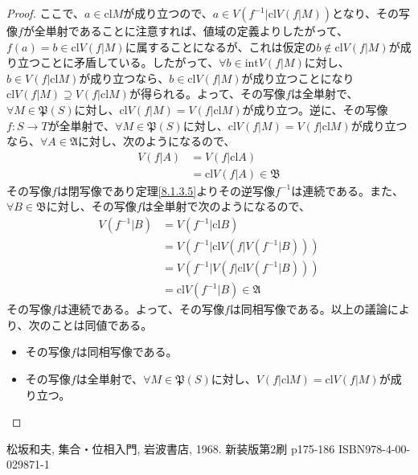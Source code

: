 \documentclass[dvipdfmx]{jsarticle}
\begin{document}
\begin{proof}
ここで、$a \in {\mathrm{cl}}M$が成り立つので、$a \in V\left( f^{- 1}|{\mathrm{cl}}{V\left( f|M \right)} \right)$となり、その写像$f$が全単射であることに注意すれば、値域の定義よりしたがって、$f(a) = b \in {\mathrm{cl}}{V\left( f|M \right)}$に属することになるが、これは仮定の$b \notin {\mathrm{cl}}{V\left( f|M \right)}$が成り立つことに矛盾している。したがって、$\forall b \in {\mathrm{int}}{V\left( f|M \right)}$に対し、$b \in V\left( f|{\mathrm{cl}}M \right)$が成り立つなら、$b \in {\mathrm{cl}}{V\left( f|M \right)}$が成り立つことになり${\mathrm{cl}}{V\left( f|M \right)} \supseteq V\left( f|{\mathrm{cl}}M \right)$が得られる。よって、その写像$f$は全単射で、$\forall M\in \mathfrak{P}(S)$に対し、${\mathrm{cl}}{V\left( f|M \right)} = V\left( f|{\mathrm{cl}}M \right)$が成り立つ。逆に、その写像$f:S \rightarrow T$が全単射で、$\forall M\in \mathfrak{P}(S)$に対し、${\mathrm{cl}}{V\left( f|M \right)} = V\left( f|{\mathrm{cl}}M \right)$が成り立つなら、$\forall A \in \mathfrak{A}$に対し、次のようになるので、
\begin{align*}
V\left( f|A \right) &= V\left( f|{\mathrm{cl}}A \right)\\
&= {\mathrm{cl}}{V\left( f|A \right)} \in \mathfrak{B}
\end{align*}
その写像$f$は閉写像であり定理\ref{8.1.3.5}よりその逆写像$f^{- 1}$は連続である。また、$\forall B \in \mathfrak{B}$に対し、その写像$f$は全単射で次のようになるので、
\begin{align*}
V\left( f^{- 1}|B \right) &= V\left( f^{- 1}|{\mathrm{cl}}B \right)\\
&= V\left( f^{- 1}|{\mathrm{cl}}{V\left( f|V\left( f^{- 1}|B \right) \right)} \right)\\
&= V\left( f^{- 1}|V\left( f|{\mathrm{cl}}{V\left( f^{- 1}|B \right)} \right) \right)\\
&= {\mathrm{cl}}{V\left( f^{- 1}|B \right)} \in \mathfrak{A}
\end{align*}
その写像$f$は連続である。よって、その写像$f$は同相写像である。以上の議論により、次のことは同値である。
\begin{itemize}
\item
  その写像$f$は同相写像である。
\item
  その写像$f$は全単射で、$\forall M \in \mathfrak{P}(S)$に対し、$V\left( f|{\mathrm{cl}}M \right) = {\mathrm{cl}}{V\left( f|M \right)}$が成り立つ。
\end{itemize}
\end{proof}
\begin{thebibliography}{50}
  松坂和夫, 集合・位相入門, 岩波書店, 1968. 新装版第2刷 p175-186 ISBN978-4-00-029871-1
\end{thebibliography}
\end{document}
